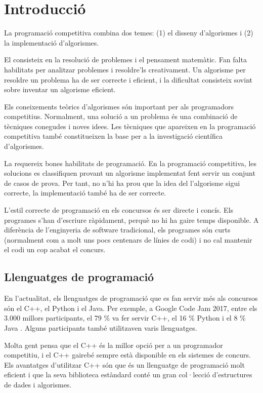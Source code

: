 \chapter{Introducció}

La programació competitiva combina dos temes:
(1) el disseny d'algorismes i (2) la implementació d'algorismes.

El  consisteix en la resolució de problemes
i el pensament matemàtic.
Fan falta habilitats per analitzar problemes i resoldre'ls
creativament.
Un algorisme per resoldre un problema
ha de ser correcte i eficient,
i la dificultat consisteix sovint
sobre inventar un algorisme eficient.

Els coneixements teòrics d'algorismes
són important per als programadors competitius.
Normalment, una solució a un problema és
una combinació de tècniques conegudes i
noves idees.
Les tècniques que apareixen en la programació competitiva
també constitueixen la base per a la investigació científica
d'algorismes.

La  requereix bones
habilitats de programació.
En la programació competitiva, les solucions
es classifiquen provant un algorisme implementat
fent servir un conjunt de casos de prova.
Per tant, no n'hi ha prou que la idea del
l'algorisme sigui correcte, la implementació també
ha de ser correcte.

L'estil correcte de programació en els concursos és
ser directe i concís.
Els programes s'han d'escriure ràpidament,
perquè no hi ha gaire temps disponible.
A diferència de l'enginyeria de software tradicional,
els programes són curts (normalment com a molt uns pocs
centenars de línies de codi) i no cal mantenir el
codi un cop acabat el concurs.

\section{Llenguatges de programació}


En l'actualitat, els llenguatges de programació que
es fan servir més als concursos són
el C++, el Python i el Java.
Per exemple, a Google Code Jam 2017,
entre els 3.000 millors participants,
el 79 \% va fer servir C++,
el 16 \% Python i
el 8 \% Java \cite{goo17}.
Alguns participants també utilitzaven varis llenguatges.

Molta gent pensa que el C++ és la millor opció
per a un programador competitiu,
i el C++ gairebé sempre està disponible en els
sistemes de concurs.
Els avantatges d'utilitzar C++ són que
és un llenguatge de programació molt eficient i
que la seva biblioteca estàndard conté un
gran col·lecció d'estructures de dades i algorismes.

